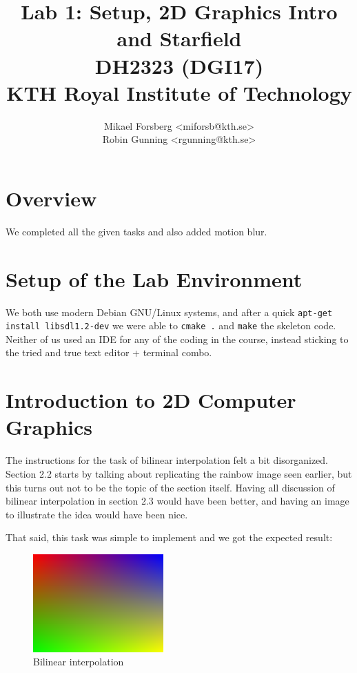 \documentclass[a4paper,11pt]{article}
\begin{document}
\title{\vspace{-2cm} Lab 1: Setup, 2D Graphics Intro and Starfield\\ \small DH2323 (DGI17)\\ KTH Royal Institute of Technology}
\author{Mikael Forsberg <miforsb@kth.se>\\ Robin Gunning <rgunning@kth.se>}
\maketitle

\vspace{-1.25cm}

\section*{Overview}
We completed all the given tasks and also added motion blur.

\section*{Setup of the Lab Environment}
We both use modern Debian GNU/Linux systems, and after a quick
\texttt{apt-get install libsdl1.2-dev} we were able to \texttt{cmake .} and \texttt{make}
the skeleton code. Neither of us used an IDE for any of the coding in the course, instead
sticking to the tried and true text editor + terminal combo.

\section*{Introduction to 2D Computer Graphics}
The instructions for the task of bilinear interpolation felt a bit disorganized. Section 2.2
starts by talking about replicating the rainbow image seen earlier, but this turns out not to be
the topic of the section itself. Having all discussion of bilinear interpolation in section 2.3
would have been better, and having an image to illustrate the idea would have been nice.

That said, this task was simple to implement and we got the expected result:

\begin{figure}[H]
\begin{center}
\includegraphics[width=5cm]{bilinear.png}
\caption{Bilinear interpolation}
\end{center}
\end{figure}
\vspace{-1.5cm}
\end{document}
